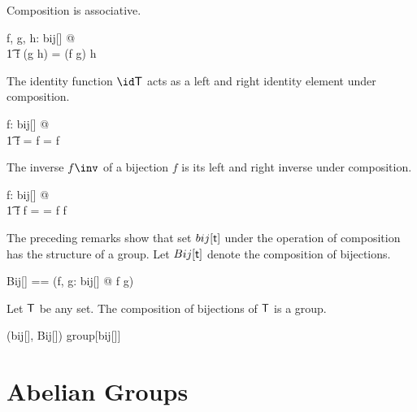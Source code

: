 \documentclass{amsart}
\begin{document}
\begin{remark}
Composition is associative.

\begin{zed}
	\forall f, g, h: bij[\setT] @ \\
	\t1	f \circ (g \circ h) = (f \circ g) \circ h
\end{zed}

\end{remark}

\begin{remark}
The identity function $\id \setT$ acts as a left and right identity element under composition.

\begin{zed}
	\forall f: bij[\setT] @ \\
	\t1	 \id \setT \circ f = f = f \circ \id \setT
\end{zed}

\end{remark}

\begin{remark}
The inverse $f \inv$ of a bijection $f$ is its left and right inverse under composition.

\begin{zed}
	\forall f: bij[\setT] @ \\
	\t1	f \circ f \inv = \id \setT = f \inv \circ f
\end{zed}

\end{remark}

The preceding remarks show that set $bij[\mathsf{t}]$ under the operation of composition has the structure of a group.
Let $Bij[\mathsf{t}]$ denote the composition of bijections.
\begin{zed}
	Bij[\genT] == (\lambda f, g: bij[\genT] @ f \circ g)
\end{zed}

\begin{example}
Let $\mathsf{T}$ be any set.
The composition of bijections of $\mathsf{T}$ is a group.

\begin{zed}
(bij[\setT], Bij[\setT]) \in group[bij[\setT]]
\end{zed}

\end{example}

\section{Abelian Groups}
\end{document}
